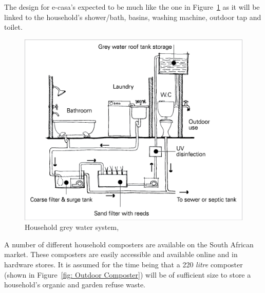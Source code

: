 \documentclass[a4paper,11pt,fleqn]{report}
\begin{document}
The design for \ac{e-casa}'s expected to be much like the one in Figure~\ref{fig: Grey water system} as it will be linked to the household's shower/bath, basins, washing machine, outdoor tap and toilet.
%
\begin{figure}[h!]
\begin{center}
\includegraphics[scale = 1.2]{Household_Grey_Water.png}
\caption{Household grey water system, \citep{AuGov2013}}
\label{fig: Grey water system}
\end{center}
\end{figure}
%
A number of different household composters are available on the South African market. These composters are easily accessible and available online and in hardware stores. It is assumed for the time being that a 220 \textit{litre} composter (shown in Figure~\ref{fig: Outdoor Composter}) will be of sufficient size to store a household's organic and garden refuse waste.
%
\end{document}
